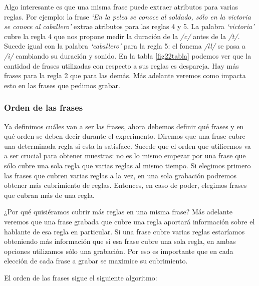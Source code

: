 Algo interesante es que una misma frase puede extraer atributos para varias reglas. Por ejemplo: la frase \textit{`En la pelea se conoce al soldado, sólo en la victoria se conoce al caballero’} extrae atributos para las reglas 4 y 5. La palabra \textit{`victoria’} cubre la regla 4 que nos propone medir la duración de la \textit{/c/} antes de la \textit{/t/}. Sucede igual con la palabra \textit{`caballero’} para la regla 5: el fonema \textit{/ll/} se pasa a \textit{/i/} cambiando su duración y sonido. En la tabla \ref{fig22tabla} podemos ver que la cantidad de frases utilizadas con respecto a sus reglas es despareja. Hay más frases para la regla 2 que para las demás. Más adelante veremos como impacta esto en las frases que pedimos grabar.


\subsubsection{Orden de las frases}

Ya definimos cuáles van a ser las frases, ahora debemos definir qué frases y en qué orden se deben decir durante el experimento. Diremos que una frase cubre una determinada regla si esta la satisface. Sucede que el orden que utilicemos va a ser crucial para obtener muestras: no es lo mismo empezar por una frase que sólo cubre una sola regla que varias reglas al mismo tiempo. Si elegimos primero las frases que cubren varias reglas a la vez, en una sola grabación podremos obtener más cubrimiento de reglas. Entonces, en caso de poder, elegimos frases que cubran más de una regla. 

¿Por qué quisiéramos cubrir más reglas en una misma frase? Más adelante veremos que una frase grabada que cubre una regla aportará información sobre el hablante de esa regla en particular. Si una frase cubre varias reglas estaríamos obteniendo más información que si esa frase cubre una sola regla, en ambas opciones utilizamos sólo una grabación. Por eso es importante que en cada elección de cada frase a grabar se maximice su cubrimiento. 

El orden de las frases sigue el siguiente algoritmo:

